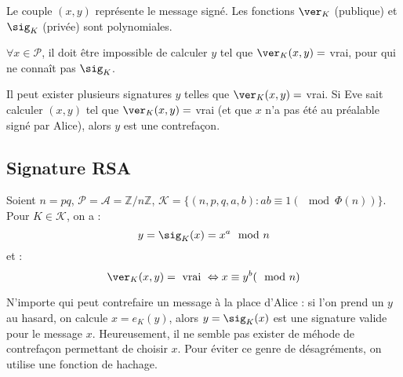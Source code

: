 \documentclass[a4paper, 10pt]{thesis}
\begin{document}
Le couple $(x, y)$ représente le message signé. Les fonctions $\ver_K$ (publique) et $\sig_K$
(privée) sont polynomiales.

$\forall x \in \mathcal{P}$, il doit être impossible de calculer $y$ tel que $\ver_K(x, y) = $ vrai,
pour qui ne connaît pas $\sig_K$.

\begin{rmq}
    Il peut exister plusieurs signatures $y$ telles que $\ver_K(x, y) = $ vrai. Si Eve sait calculer
    $(x, y)$ tel que $\ver_K(x, y) = $ vrai (et que $x$ n'a pas été au préalable signé par Alice),
    alors $y$ est une contrefaçon.
\end{rmq}

\subsection{Signature RSA}

Soient $n = pq$, $\mathcal{P} = \mathcal{A} = \mathbb{Z} / n\mathbb{Z}$, $\mathcal{K} = \{ (n, p, q,
a, b) : ab \equiv 1 (\mod \Phi(n)) \}$. Pour $K \in \mathcal{K}$, on a : 
\begin{displaymath}
    y = \sig_K(x) = x^a \mod n 
\end{displaymath}
et :
\begin{displaymath}
    \ver_K(x, y) = \mbox{ vrai } \Leftrightarrow x \equiv y^b (\mod n)
\end{displaymath}

\begin{rmq}
    N'importe qui peut contrefaire un message à la place d'Alice : si l'on prend un $y$ au hasard,
    on calcule $x = e_K(y)$, alors $y = \sig_K(x)$ est une signature valide pour le message $x$.
    Heureusement, il ne semble pas exister de méhode de contrefaçon permettant de choisir $x$.
    Pour éviter ce genre de désagréments, on utilise une fonction de hachage.
\end{rmq}
\end{document}
